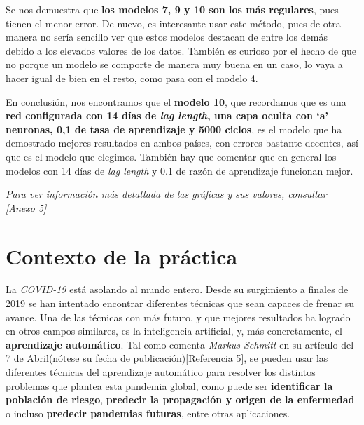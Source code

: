 \documentclass[12pt,a4paper, xcolor=table]{article}
\begin{document}
            Se nos demuestra que \textbf{los modelos 7, 9 y 10 son los más regulares}, pues tienen el menor error. De nuevo, es interesante usar este método, pues de otra manera no sería sencillo ver que estos modelos destacan de entre los demás debido a los elevados valores de los datos. También es curioso por el hecho de que no porque un modelo se comporte de manera muy buena en un caso, lo vaya a hacer igual de bien en el resto, como pasa con el modelo 4.
            
            \vspace{2mm}
            
            En conclusión, nos encontramos que el \textbf{modelo 10}, que recordamos que es una \textbf{red configurada con 14 días de \textit{lag length}, una capa oculta con ‘a’ neuronas, 0,1 de tasa de aprendizaje y 5000 ciclos}, es el modelo que ha demostrado mejores resultados en ambos países, con errores bastante decentes, así que es el modelo que elegimos. También hay que comentar que en general los modelos con 14 días de \textit{lag length} y 0.1 de razón de aprendizaje funcionan mejor.
            
            \vspace{2mm}
            
            \textit{Para ver información más detallada de las gráficas y sus valores, consultar [Anexo 5]}
    
        \newpage

    \section{Contexto de la práctica}

      La \textit{COVID-19} está asolando al mundo entero. Desde su surgimiento a finales de 2019 se han intentado encontrar diferentes técnicas que sean capaces de frenar su avance. Una de las técnicas con más futuro, y que mejores resultados ha logrado en otros campos similares, es la inteligencia artificial, y, más concretamente, el \textbf{aprendizaje automático}. Tal como comenta \textit{Markus Schmitt} en su artículo del 7 de Abril(nótese su fecha de publicación)[Referencia 5], se pueden usar las diferentes técnicas del aprendizaje automático para resolver los distintos problemas que plantea esta pandemia global, como puede ser \textbf{identificar la población de riesgo}, \textbf{predecir la propagación y origen de la enfermedad} o incluso \textbf{predecir pandemias futuras}, entre otras aplicaciones.
\end{document}
